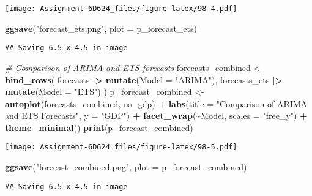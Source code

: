 \documentclass[
]{article}
\newenvironment{Shaded}{\begin{snugshade}}{\end{snugshade}}
\newcommand{\AttributeTok}[1]{\textcolor[rgb]{0.13,0.29,0.53}{#1}}
\newcommand{\CommentTok}[1]{\textcolor[rgb]{0.56,0.35,0.01}{\textit{#1}}}
\newcommand{\FunctionTok}[1]{\textcolor[rgb]{0.13,0.29,0.53}{\textbf{#1}}}
\newcommand{\NormalTok}[1]{#1}
\newcommand{\OtherTok}[1]{\textcolor[rgb]{0.56,0.35,0.01}{#1}}
\newcommand{\SpecialCharTok}[1]{\textcolor[rgb]{0.81,0.36,0.00}{\textbf{#1}}}
\newcommand{\StringTok}[1]{\textcolor[rgb]{0.31,0.60,0.02}{#1}}
\begin{document}
\texttt{[image: Assignment-6D624\_files/figure-latex/98-4.pdf]}

\begin{Shaded}
\begin{Highlighting}[]
\FunctionTok{ggsave}\NormalTok{(}\StringTok{"forecast\_ets.png"}\NormalTok{, }\AttributeTok{plot =}\NormalTok{ p\_forecast\_ets)}
\end{Highlighting}
\end{Shaded}

\begin{verbatim}
## Saving 6.5 x 4.5 in image
\end{verbatim}

\begin{Shaded}
\begin{Highlighting}[]
\CommentTok{\# Comparison of ARIMA and ETS forecasts}
\NormalTok{forecasts\_combined }\OtherTok{\textless{}{-}} \FunctionTok{bind\_rows}\NormalTok{(}
\NormalTok{  forecasts }\SpecialCharTok{|\textgreater{}} \FunctionTok{mutate}\NormalTok{(}\AttributeTok{Model =} \StringTok{"ARIMA"}\NormalTok{),}
\NormalTok{  forecasts\_ets }\SpecialCharTok{|\textgreater{}} \FunctionTok{mutate}\NormalTok{(}\AttributeTok{Model =} \StringTok{"ETS"}\NormalTok{)}
\NormalTok{)}
\NormalTok{p\_forecast\_combined }\OtherTok{\textless{}{-}} \FunctionTok{autoplot}\NormalTok{(forecasts\_combined, us\_gdp) }\SpecialCharTok{+}
  \FunctionTok{labs}\NormalTok{(}\AttributeTok{title =} \StringTok{"Comparison of ARIMA and ETS Forecasts"}\NormalTok{, }\AttributeTok{y =} \StringTok{"GDP"}\NormalTok{) }\SpecialCharTok{+}
  \FunctionTok{facet\_wrap}\NormalTok{(}\SpecialCharTok{\textasciitilde{}}\NormalTok{Model, }\AttributeTok{scales =} \StringTok{"free\_y"}\NormalTok{) }\SpecialCharTok{+}
  \FunctionTok{theme\_minimal}\NormalTok{()}
\FunctionTok{print}\NormalTok{(p\_forecast\_combined)}
\end{Highlighting}
\end{Shaded}

\texttt{[image: Assignment-6D624\_files/figure-latex/98-5.pdf]}

\begin{Shaded}
\begin{Highlighting}[]
\FunctionTok{ggsave}\NormalTok{(}\StringTok{"forecast\_combined.png"}\NormalTok{, }\AttributeTok{plot =}\NormalTok{ p\_forecast\_combined)}
\end{Highlighting}
\end{Shaded}

\begin{verbatim}
## Saving 6.5 x 4.5 in image
\end{verbatim}
\end{document}
